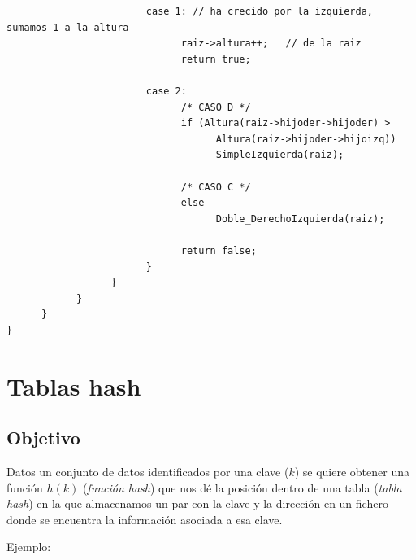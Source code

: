 \documentclass[10pt,a4paper,spanish]{report}
\begin{document}
\begin{verbatim}
                        case 1: // ha crecido por la izquierda, sumamos 1 a la altura
                              raiz->altura++;   // de la raiz
                              return true;

                        case 2:
                              /* CASO D */
                              if (Altura(raiz->hijoder->hijoder) >
                                    Altura(raiz->hijoder->hijoizq))
                                    SimpleIzquierda(raiz);

                              /* CASO C */
                              else
                                    Doble_DerechoIzquierda(raiz);

                              return false;
                        }
                  }
            }
      }
}
\end{verbatim}

\section{\textcolor[rgb]{0.3,0.4,0.8}Tablas hash}
\subsection{\textcolor[rgb]{0.3,0.4,0.8}Objetivo}
\noindent
Datos un conjunto de datos identificados por una clave ($k$) se quiere obtener una función $h(k)$ (\textit{\textcolor[rgb]{0.3,0.4,0.8}{función hash}}) 
que nos dé la posición dentro de una tabla (\textit{\textcolor[rgb]{0.3,0.4,0.8}{tabla hash}}) en la que almacenamos un par con la clave y la dirección 
en un fichero donde se encuentra la información asociada a esa clave.

\noindent
Ejemplo:
\end{document}
